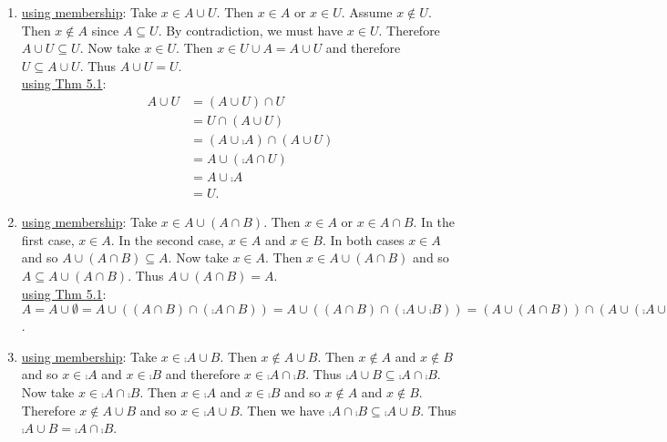 \documentclass[12pt]{book}
\begin{document}
\begin{enumerate}
{\begin{enumerate}
\underline{using Thm 5.1}: \begin{align*}A \cup A &= (A \cup A) \cap U \tag{5.1.4'}\\&= (A \cap A) \cap (A \cup \comp{A})\tag{5.1.5}\\&= A \cup (A \cap \comp{A})\tag{5.1.3}\\&= A \cup \emptyset\tag{5.1.5'}\\&= A.\tag{5.1.4}\end{align*}
\item %
\underline{using membership}: Take $x \in A \cup U$. Then $x \in A$ or $x \in U$. Assume $x \notin U$. Then $x \notin A$ since $A \subseteq U$. By contradiction, we must have $x \in U$. Therefore $A \cup U \subseteq U$. Now take $x \in U$. Then $x \in U \cup A = A \cup U$ and therefore $U \subseteq A \cup U$. Thus $A \cup U = U$.\\
\underline{using Thm 5.1}: \begin{align*}A \cup U &= (A \cup U) \cap U\tag{5.1.4'}\\&= U \cap (A \cup U)\tag{5.1.2'}\\&= (A \cup \comp{A}) \cap (A \cup U)\tag{5.1.5}\\&= A \cup (\comp{A} \cap U)\tag{5.1.3}\\&= A \cup \comp{A}\tag{5.1.4'}\\&= U.\tag{5.1.5}\end{align*}
\item %
\underline{using membership}: Take $x \in A \cup (A \cap B)$. Then $x \in A$ or $x \in A \cap B$. In the first case, $x \in A$. In the second case, $x \in A$ and $x \in B$. In both cases $x \in A$ and so $A \cup (A \cap B) \subseteq A$. Now take $x \in A$. Then $x \in A \cup (A \cap B)$ and so $A \subseteq A \cup (A \cap B)$. Thus $A \cup (A \cap B) = A$.\\
\underline{using Thm 5.1}: $A = A \cup \emptyset = A \cup ((A \cap B) \cap (\comp{A \cap B})) = A \cup ((A \cap B) \cap (\comp{A} \cup \comp{B})) = (A \cup (A \cap B)) \cap (A \cup (\comp{A} \cup \comp{B})) = (A \cup (A \cap B)) \cap ((A \cup \comp{A}) \cup \comp{B}) = (A \cup (A \cap B)) \cap (U \cup \comp{B}) = (A \cup (A \cap B)) \cap (\comp{B} \cup U) = (A \cup (A \cap B)) \cap U = A \cup (A \cap B)$.
\item %
\underline{using membership}: Take $x \in \comp{A \cup B}$. Then $x \notin A \cup B$. Then $x \notin A$ and $x \notin B$ and so $x \in \comp{A}$ and $x \in \comp{B}$ and therefore $x \in \comp{A} \cap \comp{B}$. Thus $\comp{A \cup B} \subseteq \comp{A} \cap \comp{B}$. Now take $x \in \comp{A} \cap \comp{B}$. Then $x \in \comp{A}$ and $x \in \comp{B}$ and so $x \notin A$ and $x \notin B$. Therefore $x \notin A \cup B$ and so $x \in \comp{A \cup B}$. Then we have $\comp{A} \cap \comp{B} \subseteq \comp{A \cup B}$. Thus $\comp{A \cup B} = \comp{A} \cap \comp{B}$.\\

\end{enumerate}}
\end{enumerate}
\end{document}
